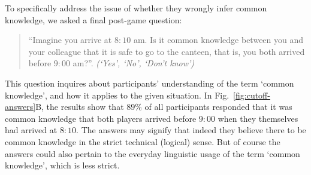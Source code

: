 To specifically address the issue of whether they wrongly infer common knowledge, we asked a final post-game question:

\begin{quote}
\indent
``Imagine you arrive at $8{:}10$ am. Is it common knowledge between you and your colleague that it is safe to go to the canteen, that is, you both arrived before $9{:}00$ am?''. \textit{(`Yes', `No', `Don't know')}
\end{quote}

\noindent
This question inquires about participants' understanding of the term `common knowledge', and how it applies to the given situation. In Fig.~\ref{fig:cutoff-answers}B, the results show that $89\%$ of all participants responded that it was common knowledge that both players arrived before $9{:}00$ when they themselves had arrived at $8{:}10$. The answers may signify that indeed they believe there to be common knowledge in the strict technical (logical) sense. But of course the answers could also pertain to the everyday linguistic usage of the term `common knowledge', which is less strict.








